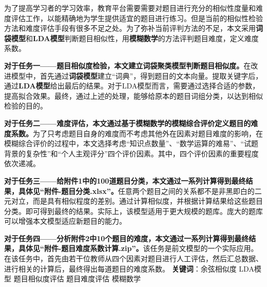 为了提高学习者的学习效率，教育平台需要需要对题目进行充分的相似性度量和难度评估工作，以能精确地为学生提供适宜的题目进行练习。但是当前的相似性检验方法和难度评估手段有很多不足之处。为了弥补当前评判方法的不足，本文采用\textbf{词袋模型}和\textbf{LDA模型}判断题目相似性，用\textbf{模糊数学}的方法评判题目难度，定义难度系数。

\textbf{对于任务一——题目相似度检验，本文建立词袋聚类模型判断题目相似度。}在改进模型中，首先通过\textbf{词袋模型}建立“词典”，得到题目的文本向量。提取关键字后，通过\textbf{LDA模型}给出最后的结果。对于LDA模型而言，需要通过选择合适的参数，提高拟合效果。最终，通过上述的处理，能够给原本的题目词组分类，以达到相似检验的目的。

\textbf{对于任务二——难度评估，本文通过基于模糊数学的模糊综合评价定义题目的难度系数。}为了只考虑题目自身的难度而不考虑其他外在因素对题目难度的影响，在模糊综合评价的过程中，本文选择考虑“知识点数量”、“数学运算的难易”、“试题背景的复杂性”和“个人主观评分”四个评价因素。其中，四个评价因素的重要程度依次递减。

\textbf{对于任务三——给附件1中的100道题目分类，本文通过一系列计算得到最终结果，具体见“附件-题目分类.xlsx”。}任意两个题目之间的关系都不是非黑即白的二元对立，而是具有相似程度的差别。通过计算相似度，并根据计算结果给这些题目分类。即可得到最终的结果。实际上，该模型适用于更大规模的题库。庞大的题库可以增强本文模型适应新题目的能力。

\textbf{对于任务四——分析附件2中10个题目的难度，本文通过一系列计算得到最终结果，具体见“附件-题目难度系数计算.zip”。}该任务是前文模型的一个实际应用。在该任务中，首先由若干位教师从四个因素对题目进行人工评估，然后汇总数据、进行相关的计算后，最终得出每道题目的难度系数。
\newline
\newline
\textbf{关键词}：余弦相似度 \quad LDA模型 \quad 题目相似度评估 \quad 题目难度评估 \quad 模糊数学

\newpage
\thispagestyle{empty}
\tableofcontents